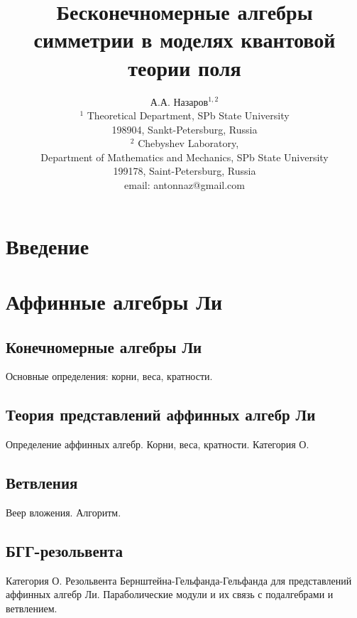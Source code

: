 \documentclass[12pt]{disser}
\theoremstyle{definition}
\begin{document}
\title{Бесконечномерные алгебры симметрии в моделях квантовой теории поля}
\author{А.А. Назаров$^{1,2}$\\
{\small $^1$ Theoretical Department, SPb State University}\\
{\small 198904, Sankt-Petersburg, Russia}\\
{\small$^{2}$ Chebyshev Laboratory,}\\
{\small Department of Mathematics and Mechanics, SPb State University}\\
{\small 199178, Saint-Petersburg, Russia}\\
{\small email: antonnaz@gmail.com}}

\maketitle

\begin{abstract}
\end{abstract}

\tableofcontents

\chapter{Введение}
\label{cha:intro}

\chapter{Аффинные алгебры Ли}
\label{cha:affine-lie-algebras}

\section{Конечномерные алгебры Ли}
\label{sec:finite-dimensional}
Основные определения: корни, веса, кратности.

\section{Теория представлений аффинных алгебр Ли}
\label{sec:representation-theory}
Определение аффинных алгебр. Корни, веса, кратности. Категория О.

\section{Ветвления}
\label{sec:branching}
Веер вложения. Алгоритм.

\section{БГГ-резольвента}
\label{sec:bgg}
Категория О.
Резольвента Бернштейна-Гельфанда-Гельфанда для представлений аффинных алгебр Ли. Параболические модули и их связь с подалгебрами и ветвлением.
\end{document}
